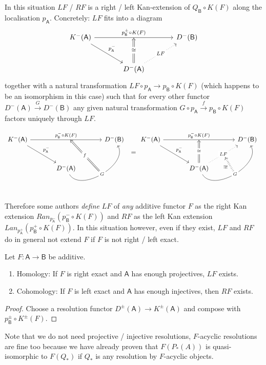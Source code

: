 \documentclass[fontsize=11pt,fleqn,a4paper]{scrartcl}
\begin{document}
\begin{remark}
In this situation $LF$ / $RF$ is a right / left Kan-extension of $Q_\mathsf{B}\circ K(F)$ along the localisation $p_\mathsf{A}$. Concretely: $LF$ fits into a diagram
\[\begin{tikzcd}[sep = large]
K^-(\mathsf{A}) \ar[rr,"p_\mathsf{B}^\pm\circ K(F)"{name=top_arrow}] \ar[dr,"p_\mathsf{A}^-"] && D^-(\mathsf{B}) \\
 & D^-(\mathsf{A}) \ar[ur,dotted,"LF"{name=LF, description}] \ar[to=top_arrow,Rightarrow,"\isomorphic" description]
\end{tikzcd}\]
together with a natural transformation $LF \circ p_\mathsf{A} \to p_\mathsf{B} \circ K(F)$ (which happens to be an isomorphism in this case) such that for every other functor $D^-(\mathsf{A}) \xrightarrow{G} D^-(\mathsf{B})$ any given natural transformation $G \circ p_\mathsf{A} \xrightarrow{f} p_\mathsf{B} \circ K(F)$ factors uniquely through $LF$.

\[\begin{tikzcd}[sep = large]
K^-(\mathsf{A}) \ar[rr,"p_\mathsf{B}^-\circ K(F)"{name=top_arrow}] \ar[dr,"p_\mathsf{A}^-"] && D^-(\mathsf{B}) \\
 & D^-(\mathsf{A}) \ar[ur,bend right=90,"G"{name=G, description}]
\arrow[to=top_arrow,from=G, Rightarrow,"f" description]
\end{tikzcd}
=
\begin{tikzcd}[sep = large]
K^-(\mathsf{A}) \ar[rr,"p_\mathsf{B}^-\circ K(F)"{name=top_arrow}] \ar[dr,"p_\mathsf{A}^-"] && D^-(\mathsf{B}) \\
 & D^-(\mathsf{A}) \ar[ur,dotted,"LF"{name=LF, description}] \ar[ur,bend right=90,"G"{name=G,description}] \ar[to=top_arrow,Rightarrow,"\isomorphic" description]
\arrow[Rightarrow,dotted, to=LF, from=G,"\exists!"]
\end{tikzcd}\]

Therefore some authors \emph{define} $LF$ of \emph{any} additive functor $F$ as the right Kan extension $Ran_{p_\mathsf{A}^-}( p_\mathsf{B}^- \circ K(F))$ and $RF$ as the left Kan extension $Lan_{p_\mathsf{A}^+}(p_\mathsf{B}^+\circ K(F))$. In this situation however, even if they exist, $LF$ and $RF$ do in general not extend $F$ if $F$ is not right / left exact.
\end{remark}

\begin{theorem}
Let $F:\mathsf{A}\to\mathsf{B}$ be additive.
\begin{enumerate}
\item Homology: If $F$ is right exact and $\mathsf{A}$ has enough projectives, $LF$ exists.
\item Cohomology: If $F$ is left exact and $\mathsf{A}$ has enough injectives, then $RF$ exists.
\end{enumerate}
\end{theorem}
\begin{proof}
Choose a resolution functor $D^\pm(\mathsf{A}) \to K^\pm(\mathsf{A})$ and compose with $p_\mathsf{B}^\pm\circ K^\pm(F)$.
\end{proof}

\begin{remark}
Note that we do not need projective / injective resolutions, $F$-acyclic resolutions are fine too because we have already proven that $F(P_\ast(A))$ is quasi-isomorphic to $F(Q_\ast)$ if $Q_\ast$ is any resolution by $F$-acyclic objects.
\end{remark}
\end{document}
